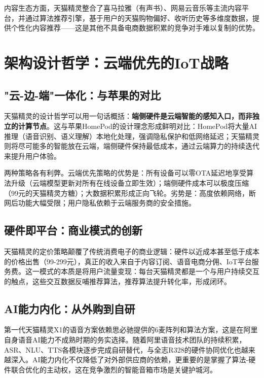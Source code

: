 \documentclass[12pt, a4paper, twoside, openright]{book}
\begin{document}
内容生态方面，天猫精灵整合了喜马拉雅（有声书）、网易云音乐等主流内容平台，并通过算法推荐引擎，基于用户的天猫购物偏好、收听历史等多维度数据，提供个性化内容推荐——这是其他不具备电商数据积累的竞争对手难以复制的优势。

\chapter{架构设计哲学：云端优先的IoT战略}
\label{chap:strategy}

\section{"云-边-端"一体化：与苹果的对比}

天猫精灵的设计哲学可以用一句话概括：\textbf{端侧硬件是云端智能的感知入口，而非独立的计算节点}。这与苹果HomePod的设计理念形成鲜明对比：HomePod将大量AI推理（语音识别、语义理解）本地化处理，强调隐私保护和低网络延迟；天猫精灵则将尽可能多的智能放在云端，端侧硬件保持最低成本，通过云端算力的持续迭代来提升用户体验。

两种策略各有利弊。云端优先策略的优势是：所有设备可以零OTA延迟地享受算法升级（云端模型更新对所有在线设备立即生效）；端侧硬件成本可以极度压缩（99元的天猫精灵方糖）；大数据积累形成正向飞轮。劣势是：高度依赖网络，断网后功能大幅受限；用户隐私依赖于云端服务商的安全措施。

\section{硬件即平台：商业模式的创新}

天猫精灵的定价策略颠覆了传统消费电子的商业逻辑：硬件以近成本甚至低于成本的价格出售（99-299元），真正的收入来自于内容订阅、语音电商分佣、IoT平台服务费。这一模式的本质是将用户流量变现：每台天猫精灵都是一个与用户持续交互的触点，这些交互数据反哺推荐算法，推荐算法提升转化率，形成闭环。

\section{AI能力内化：从外购到自研}

第一代天猫精灵X1的语音方案依赖思必驰提供的6麦阵列和算法方案，这是在阿里自身语音AI能力不成熟时期的务实选择。随着阿里语音技术团队的持续积累，ASR、NLU、TTS各模块逐步完成自研替代，与全志R328的硬件协同优化也越来越深入。AI能力内化不仅降低了对外部供应商的依赖，更重要的是掌握了算法-硬件联合优化的主动权，这在竞争激烈的智能音箱市场是关键护城河。
\end{document}
